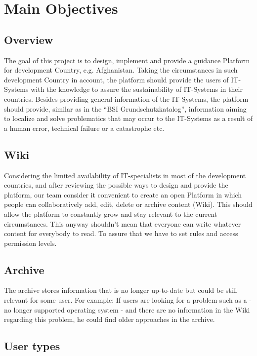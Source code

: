 \chapter{Main Objectives}
\section{Overview}

The goal of this project is to design, implement and provide a guidance Platform for development Country, e.g. Afghanistan. Taking the circumstances in such development Country in account, the platform should provide the users of IT-Systems with the knowledge to assure the sustainability of IT-Systems in their countries. Besides providing general information of the IT-Systems, the platform should provide, similar as in the “BSI Grundschutzkatalog”, information aiming to localize and solve problematics that may occur to the IT-Systems as a result of a human error, technical failure or a catastrophe etc. 

\section{Wiki}
Considering the limited availability of IT-specialists in most of the development countries, and after reviewing the possible ways to design and provide the platform, our team consider it convenient to create an open Platform in which people can collaboratively add, edit, delete or archive content (Wiki). This should allow the platform to constantly grow and stay relevant to the current circumstances. This anyway shouldn’t mean that everyone can write whatever content for everybody to read. To assure that we have to set rules and access permission levels. 

\section{Archive}
\label{archive}
The archive stores information that is no longer up-to-date but could be still relevant for some user. For example: If users are looking for a problem such as a - no longer supported operating system - and there are no information in the Wiki regarding this problem, he could find older approaches in the archive.
\section{User types}

